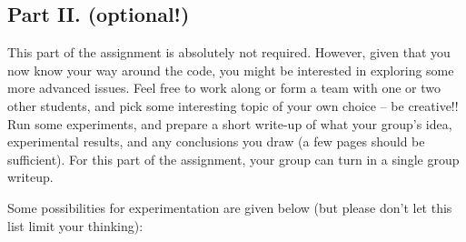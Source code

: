 \subsection{Part II. ({\bf optional!})}

This part of the assignment is absolutely not required.  However, given that
you now know your way around the code, you might be interested in exploring
some more advanced issues.  Feel free to work along or form a team with one or
two other students, and pick some interesting topic of your own choice -- be
creative!!  Run some experiments, and prepare a short write-up of what your
group's idea, experimental results, and any conclusions you draw (a few pages
should be sufficient).  For this part of the assignment, your group can turn
in a single group writeup.  


Some possibilities for experimentation are given below (but please don't let
this list limit your thinking):

